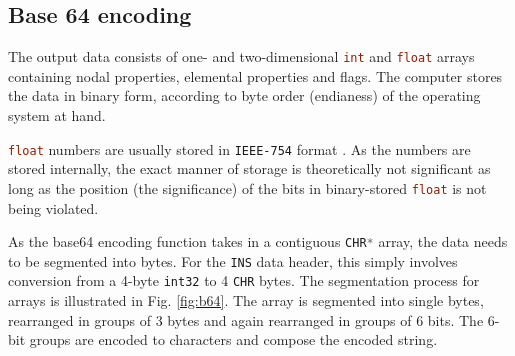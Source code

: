 \subsection{Base 64 encoding}
\label{subsec:b64encoding}


The output data consists of one- and two-dimensional \lstinline[language=C]{int} and \lstinline[language=C]{float} arrays containing nodal properties, elemental properties and flags. The computer stores the data in binary form, according to byte order (endianess) of the operating system at hand.

\bigbreak
\lstinline[language=C]{float} numbers are usually stored in \texttt{IEEE-754} format \cite{Asp14}. As the numbers are stored internally, the exact manner of storage is theoretically not significant as long as the position (the significance) of the bits in binary-stored \lstinline[language=C]{float} is not being violated.   

\bigbreak
As the base64 encoding function takes in a contiguous \lstinline[language=C]{CHR*} array, the data needs to be segmented into bytes. For the \lstinline[language=C]{INS} data header, this simply involves conversion from a 4-byte \lstinline[language=C]{int32} to 4 \lstinline[language=C]{CHR} bytes. The segmentation process for arrays is illustrated in Fig. \ref{fig:b64}. The array is segmented into single bytes, rearranged in groups of 3 bytes and again rearranged in groups of 6 bits. The 6-bit groups are encoded to characters and compose the encoded string. 

